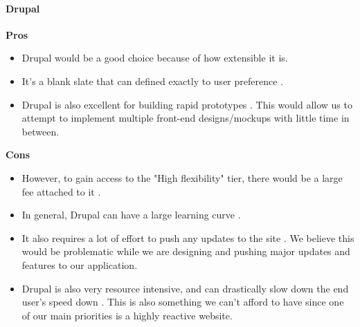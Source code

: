 	\paragraph{Drupal}	
		\textbf{Pros} 
			\begin{itemize}
				\item Drupal would be a good choice because of how extensible it is. 
				\item It's a blank slate that can defined exactly to user preference \cite{drupalPC}. 
				\item Drupal is also excellent for building rapid prototypes \cite{drupalPC}. This would allow us to attempt to implement multiple front-end designs/mockups with little time in between.
			\end{itemize}
		\textbf{Cons}
			\begin{itemize}
				\item However, to gain access to the "High flexibility" tier, there would be a large fee attached to it \cite{drupalOSU}. 
				\item In general, Drupal can have a large learning curve \cite{drupalPC}. 
				\item It also requires a lot of effort to push any updates to the site \cite{drupalPC}. We believe this would be problematic while we are designing and pushing major updates and features to our application. 
				\item Drupal is also very resource intensive, and can drastically slow down the end user's speed down \cite{drupalPC}. This is also something we can't afford to have since one of our main priorities is a highly reactive website.
			\end{itemize}
			
